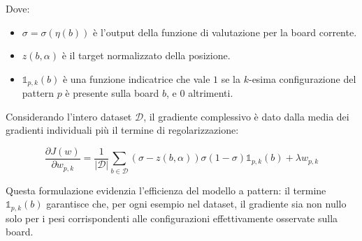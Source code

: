 Dove:
\begin{itemize}
    \item $\sigma = \sigma(\eta(b))$ è l'output della funzione di valutazione per la board corrente.
    \item $z(b,\alpha)$ è il target normalizzato della posizione.
    \item $\mathbb{1}_{p,k}(b)$ è una funzione indicatrice che vale $1$ se la $k$-esima configurazione del pattern $p$ è presente sulla board $b$, e $0$ altrimenti.
\end{itemize}

Considerando l'intero dataset $\mathcal{D}$, il gradiente complessivo è dato dalla media dei gradienti individuali più il termine di regolarizzazione:

\begin{equation}
    \frac{\partial J(w)}{\partial w_{p,k}} = \frac{1}{|\mathcal{D}|} \sum_{b \in \mathcal{D}} (\sigma - z(b, \alpha)) \sigma(1 - \sigma) \mathbb{1}_{p,k}(b) + \lambda w_{p,k}
\end{equation}

Questa formulazione evidenzia l'efficienza del modello a pattern: il termine $\mathbb{1}_{p,k}(b)$ garantisce che, per ogni esempio nel dataset,
il gradiente sia non nullo solo per i pesi corrispondenti alle configurazioni effettivamente osservate sulla board.
